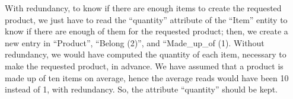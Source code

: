 With redundancy, to know if there are enough items to create the requested product, we just have to read the ``quantity'' attribute of the ``Item'' entity to know if there are enough of them for the requested product; then, we create a new entry in ``Product'', ``Belong (2)'', and ``Made\_up\_of (1). Without redundancy, we would have computed the quantity of each item, necessary to make the requested product, in advance. We have assumed that a product is made up of ten items on average, hence the average reads would have been 10 instead of 1, with redundancy. So, the attribute ``quantity'' should be kept.